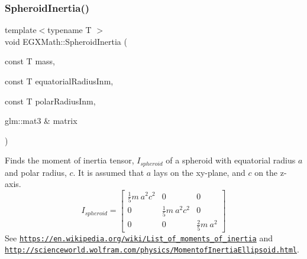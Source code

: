 \subsubsection{\texorpdfstring{Spheroid\+Inertia()}{SpheroidInertia()}\hspace{0.1cm}{\footnotesize\ttfamily [3/3]}}
{\footnotesize\ttfamily template$<$typename T $>$ \\
void E\+G\+X\+Math\+::\+Spheroid\+Inertia (\begin{DoxyParamCaption}\item[{const T}]{mass,  }\item[{const T}]{equatorial\+Radius\+Inm,  }\item[{const T}]{polar\+Radius\+Inm,  }\item[{glm\+::mat3 \&}]{matrix }\end{DoxyParamCaption})}



Finds the moment of inertia tensor, $I_{spheroid}$ of a spheroid with equatorial radius $a$ and polar radius, $c$. It is assumed that $a$ lays on the xy-\/plane, and $c$ on the z-\/axis. \[ I_{spheroid}=\begin{bmatrix} \frac{1}{5}m\ a^2c^2 & 0 & 0\\ 0 & \frac{1}{5}m\ a^2c^2 & 0\\ 0 & 0 & \frac{2}{5}m\ a^2 \end{bmatrix} \] See \href{https://en.wikipedia.org/wiki/List_of_moments_of_inertia}{\tt https\+://en.\+wikipedia.\+org/wiki/\+List\+\_\+of\+\_\+moments\+\_\+of\+\_\+inertia} and \href{http://scienceworld.wolfram.com/physics/MomentofInertiaEllipsoid.html}{\tt http\+://scienceworld.\+wolfram.\+com/physics/\+Momentof\+Inertia\+Ellipsoid.\+html}. 


